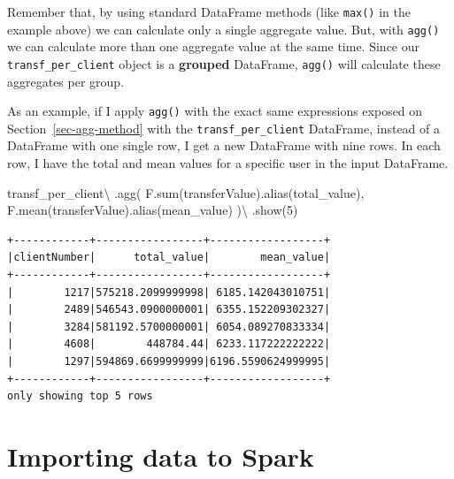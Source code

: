 \documentclass[
  11pt,
  letterpaper,
  DIV=11,
  numbers=noendperiod]{scrreprt}
\newenvironment{Shaded}{\begin{snugshade}}{\end{snugshade}}
\newcommand{\BuiltInTok}[1]{\textcolor[rgb]{0.00,0.23,0.31}{#1}}
\newcommand{\DecValTok}[1]{\textcolor[rgb]{0.68,0.00,0.00}{#1}}
\newcommand{\NormalTok}[1]{\textcolor[rgb]{0.00,0.23,0.31}{#1}}
\newcommand{\OperatorTok}[1]{\textcolor[rgb]{0.37,0.37,0.37}{#1}}
\newcommand{\StringTok}[1]{\textcolor[rgb]{0.13,0.47,0.30}{#1}}
\begin{document}
Remember that, by using standard DataFrame methods (like \texttt{max()}
in the example above) we can calculate only a single aggregate value.
But, with \texttt{agg()} we can calculate more than one aggregate value
at the same time. Since our \texttt{transf\_per\_client} object is a
\textbf{grouped} DataFrame, \texttt{agg()} will calculate these
aggregates per group.

As an example, if I apply \texttt{agg()} with the exact same expressions
exposed on Section~\ref{sec-agg-method} with the
\texttt{transf\_per\_client} DataFrame, instead of a DataFrame with one
single row, I get a new DataFrame with nine rows. In each row, I have
the total and mean values for a specific user in the input DataFrame.

\begin{Shaded}
\begin{Highlighting}[]
\NormalTok{transf\_per\_client}\OperatorTok{\textbackslash{}}
\NormalTok{  .agg(}
\NormalTok{    F.}\BuiltInTok{sum}\NormalTok{(}\StringTok{\textquotesingle{}transferValue\textquotesingle{}}\NormalTok{).alias(}\StringTok{\textquotesingle{}total\_value\textquotesingle{}}\NormalTok{),}
\NormalTok{    F.mean(}\StringTok{\textquotesingle{}transferValue\textquotesingle{}}\NormalTok{).alias(}\StringTok{\textquotesingle{}mean\_value\textquotesingle{}}\NormalTok{)}
\NormalTok{  )}\OperatorTok{\textbackslash{}}
\NormalTok{  .show(}\DecValTok{5}\NormalTok{)}
\end{Highlighting}
\end{Shaded}

\begin{verbatim}
+------------+-----------------+------------------+
|clientNumber|      total_value|        mean_value|
+------------+-----------------+------------------+
|        1217|575218.2099999998| 6185.142043010751|
|        2489|546543.0900000001| 6355.152209302327|
|        3284|581192.5700000001| 6054.089270833334|
|        4608|        448784.44| 6233.117222222222|
|        1297|594869.6699999999|6196.5590624999995|
+------------+-----------------+------------------+
only showing top 5 rows
\end{verbatim}


\hypertarget{sec-import}{%
\chapter{Importing data to Spark}\label{sec-import}}
\end{document}
